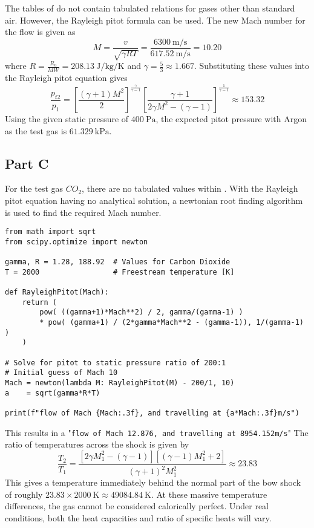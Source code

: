 \documentclass[a4paper]{article}
\begin{document}
The tables of \cite{NASATables} do not contain tabulated relations for gases other than standard air. However, the Rayleigh pitot formula can be used. The new Mach number for the flow is given as
\begin{equation*}
	M = \frac{v}{\sqrt{\gamma R T}}
	= \frac{\SI{6300}{\metre\per\second}}{\SI{617.52}{\metre\per\second}}
	= 10.20
\end{equation*}
where \(R = \frac{R_u}{MW} = \SI{208.13}{\joule\per\kilogram\per\kelvin}\) and \(\gamma = \frac{5}{3} \approx 1.667\). Substituting these values into the Rayleigh pitot equation gives
\begin{equation*}
	\frac{p_{t2}}{p_1}
	= \left[ \frac{(\gamma+1)M^2}{2} \right]^\frac{\gamma}{\gamma-1}
	\left[ \frac{\gamma+1}{2\gamma M^2 - (\gamma-1)} \right]^\frac{1}{\gamma-1}
	\approx 153.32
\end{equation*}
Using the given static pressure of \(\SI{400}{\pascal}\), the expected pitot pressure with Argon as the test gas is \(\SI{61.329}{\kilo\pascal}\).

\newpage
\subsection*{Part C}

For the test gas \(CO_2\), there are no tabulated values within \cite{NASATables}. With the Rayleigh pitot equation having no analytical solution, a newtonian root finding algorithm is used to find the required Mach number.

\begin{verbatim}
from math import sqrt
from scipy.optimize import newton

gamma, R = 1.28, 188.92  # Values for Carbon Dioxide
T = 2000                 # Freestream temperature [K]

def RayleighPitot(Mach):
	return (
		pow( ((gamma+1)*Mach**2) / 2, gamma/(gamma-1) )
		* pow( (gamma+1) / (2*gamma*Mach**2 - (gamma-1)), 1/(gamma-1) )
	)

# Solve for pitot to static pressure ratio of 200:1
# Initial guess of Mach 10
Mach = newton(lambda M: RayleighPitot(M) - 200/1, 10)
a    = sqrt(gamma*R*T)

print(f"flow of Mach {Mach:.3f}, and travelling at {a*Mach:.3f}m/s")
\end{verbatim}
This results in a "\texttt{flow of Mach 12.876, and travelling at 8954.152m/s}"
The ratio of temperatures across the shock is given by
\begin{equation*}
	\frac{T_2}{T_1}
	= \frac{
		\left[ 2 \gamma M_1^2 - (\gamma-1) \right]
		\left[ (\gamma-1)M_1^2 + 2 \right]
	}{(\gamma+1)^2 M_1^2}
	\approx 23.83
\end{equation*}
This gives a temperature immediately behind the normal part of the bow shock of roughly \(23.83\times\SI{2000}{\kelvin} \approx \SI{49084.84}{\kelvin}\).
At these massive temperature differences, the gas cannot be considered calorically perfect. Under real conditions, both the heat capacities and ratio of specific heats will vary.

\printbibliography
\end{document}
